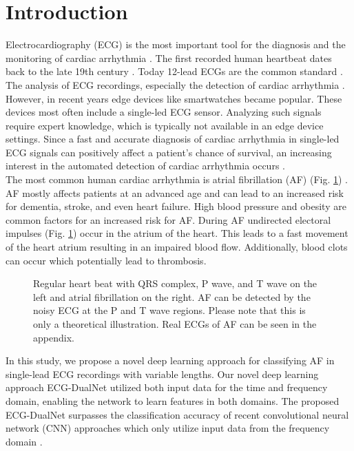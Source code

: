 \section{Introduction} \label{sec:introduction}

Electrocardiography (ECG) is the most important tool for the diagnosis and the monitoring of cardiac arrhythmia \cite{Becker2006, Anderson2009, Alghatrif2012}. The first recorded human heartbeat dates back to the late 19th century \cite{Alghatrif2012}. Today 12-lead ECGs are the common standard \cite{Alghatrif2012}. The analysis of ECG recordings, especially the detection of cardiac arrhythmia \cite{Becker2006}. However, in recent years edge devices like smartwatches became popular. These devices most often include a single-led ECG sensor. Analyzing such signals require expert knowledge, which is typically not available in an edge device settings. Since a fast and accurate diagnosis of cardiac arrhythmia in single-led ECG signals can positively affect a patient's chance of survival, an increasing interest in the automated detection of cardiac arrhythmia occurs \cite{Becker2006, Antink2017, Zihlmann2017, Clifford2017}. \\
\indent The most common human cardiac arrhythmia is atrial fibrillation (AF) (Fig. \ref{fig:beat}) \cite{Herold2019}. AF mostly affects patients at an advanced age and can lead to an increased risk for dementia, stroke, and even heart failure. High blood pressure and obesity are common factors for an increased risk for AF. During AF undirected electoral impulses (Fig. \ref{fig:beat}) occur in the atrium of the heart. This leads to a fast movement of the heart atrium resulting in an impaired blood flow. Additionally, blood clots can occur which potentially lead to thrombosis. \cite{Becker2006, Herold2019}\\
\begin{figure}[!ht] 
    \centering
    
    \vspace{-0.6cm}
    \caption{Regular heart beat with QRS complex, P wave, and T wave on the left and atrial fibrillation on the right. AF can be detected by the noisy ECG at the P and T wave regions. Please note that this is only a theoretical illustration. Real ECGs of AF can be seen in the appendix.}
    \label{fig:beat}
\end{figure}
\indent In this study, we propose a novel deep learning approach for classifying AF in single-lead ECG recordings with variable lengths. Our novel deep learning approach ECG-DualNet utilized both input data for the time and frequency domain, enabling the network to learn features in both domains. The proposed ECG-DualNet surpasses the classification accuracy of recent convolutional neural network (CNN) approaches which only utilize input data from the frequency domain \cite{Zihlmann2017}.


